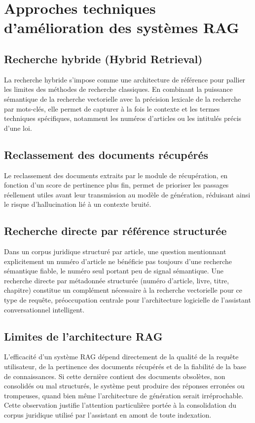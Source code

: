 \iffalse
\section{Approches techniques d'amélioration des systèmes RAG}

\subsection{Recherche hybride (Hybrid Retrieval)}

La recherche hybride s'impose comme une architecture de référence pour pallier les limites des méthodes de recherche classiques. En combinant la puissance sémantique de la recherche vectorielle avec la précision lexicale de la recherche par mots-clés, elle permet de capturer à la fois le contexte et les termes techniques spécifiques, notamment les numéros d'articles ou les intitulés précis d'une loi.

\subsection{Reclassement des documents récupérés}

Le reclassement des documents extraits par le module de récupération, en fonction d'un score de pertinence plus fin, permet de prioriser les passages réellement utiles avant leur transmission au modèle de génération, réduisant ainsi le risque d'hallucination lié à un contexte bruité.

\subsection{Recherche directe par référence structurée}

Dans un corpus juridique structuré par article, une question mentionnant explicitement un numéro d'article ne bénéficie pas toujours d'une recherche sémantique fiable, le numéro seul portant peu de signal sémantique. Une recherche directe par métadonnée structurée (numéro d'article, livre, titre, chapitre) constitue un complément nécessaire à la recherche vectorielle pour ce type de requête, préoccupation centrale pour l'architecture logicielle de l'assistant conversationnel intelligent.

\subsection{Limites de l'architecture RAG}

L'efficacité d'un système RAG dépend directement de la qualité de la requête utilisateur, de la pertinence des documents récupérés et de la fiabilité de la base de connaissances. Si cette dernière contient des documents obsolètes, non consolidés ou mal structurés, le système peut produire des réponses erronées ou trompeuses, quand bien même l'architecture de génération serait irréprochable. Cette observation justifie l'attention particulière portée à la consolidation du corpus juridique utilisé par l'assistant en amont de toute indexation.

